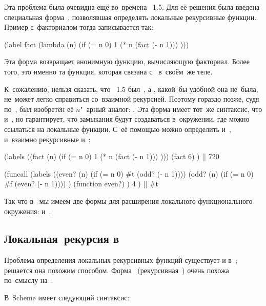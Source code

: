 Эта проблема была очевидна ещё во~времена \LISP~1.5. Для её решения была введена
специальная форма~, позволявшая определять локальные рекурсивные
функции. Пример с~факториалом тогда записывается так:

\begin{code:lisp}
(label fact (lambda (n) (if (= n 0) 1
                            (* n (fact (- n 1))) )))
\end{code:lisp}

Эта форма возвращает анонимную функцию, вычисляющую факториал. Более того, это
именно та функция, которая связана с~ в~своём~же теле.

К~сожалению, нельзя сказать, что \LISP~1.5 был~, а , какой~бы
удобной она не~была, не~может легко справиться со~взаимной рекурсией. Поэтому
гораздо позже, судя по~\cite{hs75}, был изобретён её $n$"~арный аналог:
. Эта форма имеет тот~же синтаксис, что и~, но гарантирует,
что замыкания будут создаваться в~окружении, где можно ссылаться на локальные
функции. С~её помощью можно определить и~, и~взаимно рекурсивные
 и~:

\begin{code:lisp}
(labels ((fact (n) (if (= n 0) 1
                       (* n (fact (- n 1))) )))
  (fact 6) ) |\is| 720

(funcall (labels ((even? (n) (if (= n 0) #t (odd? (- n 1))))
                  (odd? (n) (if (= n 0) #f (even? (- n 1)))) )
           (function even?) )
         4 ) |\is| #t
\end{code:lisp}

Так что в~ мы имеем две формы для расширения локального функционального
окружения:  и~.


\subsection{\texorpdfstring{Локальная~рекурсия в~}%
{Локальная рекурсия в Lisp₁}}%
\label{lisp1-2-omega/recusion/ssect:local-lisp1}

Проблема определения локальных рекурсивных функций существует и в~;
решается она похожим способом. Форма~ (рекурсивная~) очень
похожа по~смыслу на~.

В~Scheme  имеет следующий синтаксис:

